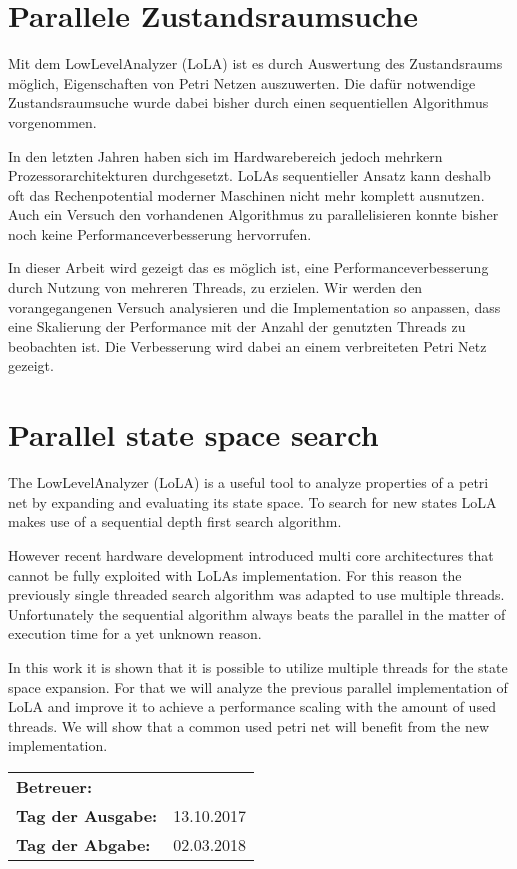 \section*{Parallele Zustandsraumsuche}
Mit dem LowLevelAnalyzer (LoLA) ist es durch Auswertung des Zustandsraums möglich, Eigenschaften von Petri Netzen auszuwerten. Die dafür notwendige Zustandsraumsuche wurde dabei bisher durch einen sequentiellen Algorithmus vorgenommen.

In den letzten Jahren haben sich im Hardwarebereich jedoch mehrkern Prozessorarchitekturen durchgesetzt. LoLAs sequentieller Ansatz kann deshalb oft das Rechenpotential moderner Maschinen nicht mehr komplett ausnutzen. Auch ein Versuch den vorhandenen Algorithmus zu parallelisieren konnte bisher noch keine Performanceverbesserung hervorrufen.

In dieser Arbeit wird gezeigt das es möglich ist, eine Performanceverbesserung durch Nutzung von mehreren Threads, zu erzielen. Wir werden den vorangegangenen Versuch analysieren und die Implementation so anpassen, dass eine Skalierung der Performance mit der Anzahl der genutzten Threads zu beobachten ist. Die Verbesserung wird dabei an einem verbreiteten Petri Netz gezeigt.

\section*{Parallel state space search}
The LowLevelAnalyzer (LoLA) is a useful tool to analyze properties of a petri net by expanding and evaluating its state space. To search for new states LoLA makes use of a sequential depth first search algorithm.

However recent hardware development introduced multi core architectures that cannot be fully exploited with LoLAs implementation. For this reason the previously single threaded search algorithm was adapted to use multiple threads. Unfortunately the sequential algorithm always beats the parallel in the matter of execution time for a yet unknown reason.

In this work it is shown that it is possible to utilize multiple threads for the state space expansion. For that we will analyze the previous parallel implementation of LoLA and improve it to achieve a performance scaling with the amount of used threads. We will show that a common used petri net will benefit from the new implementation.



\vfill

\begin{tabular}{ll}
	\bfseries Betreuer: & \parbox[t]{10cm}{\betreuer }\vspace{5mm} \\
	\bfseries Tag der Ausgabe: & 13.10.2017 \\
	\bfseries Tag der Abgabe: & 02.03.2018 \\
\end{tabular}